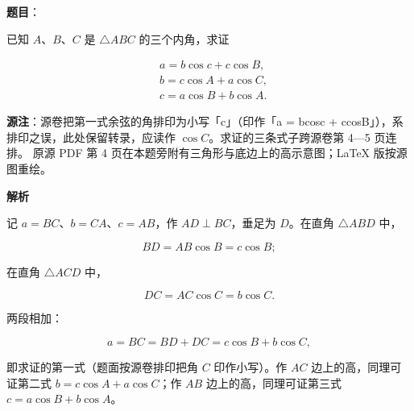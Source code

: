 \begin{answer}

\textbf{题目}：

已知 $A$、$B$、$C$ 是 $\triangle ABC$ 的三个内角，求证

\nopagebreak[4]
\[
\begin{aligned}
&a=b\cos c+c\cos B,\\
&b=c\cos A+a\cos C,\\
&c=a\cos B+b\cos A.
\end{aligned}
\]

\begin{gktip}
\textbf{源注}：源卷把第一式余弦的角排印为小写「c」（印作「a = bcosc + ccosB」），系排印之误，此处保留转录，应读作 $\cos C$。求证的三条式子跨源卷第 4—5 页连排。
原源 PDF 第 4 页在本题旁附有三角形与底边上的高示意图；LaTeX 版按源图重绘。
\end{gktip}
\nopagebreak[4]
\begin{center}\end{center}
\nopagebreak[4]
\textbf{解析}
\nopagebreak[4]
\begin{center}\end{center}
\nopagebreak[4]
记 $a=BC$、$b=CA$、$c=AB$，作 $AD\perp BC$，垂足为 $D$。在直角 $\triangle ABD$ 中，

\nopagebreak[4]
\[
BD=AB\cos B=c\cos B;
\]

在直角 $\triangle ACD$ 中，

\nopagebreak[4]
\[
DC=AC\cos C=b\cos C.
\]

两段相加：

\nopagebreak[4]
\[
a=BC=BD+DC=c\cos B+b\cos C,
\]

即求证的第一式（题面按源卷排印把角 $C$ 印作小写）。作 $AC$ 边上的高，同理可证第二式 $b=c\cos A+a\cos C$；作 $AB$ 边上的高，同理可证第三式 $c=a\cos B+b\cos A$。


\end{answer}
